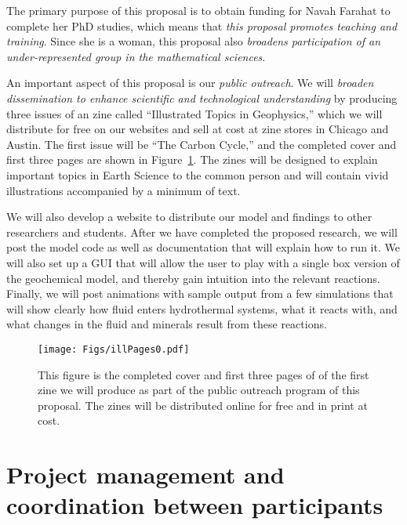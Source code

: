\documentclass[authoryear,round,12pt]{article}
\begin{document}
The primary purpose of this proposal is to obtain funding for Navah
Farahat to complete her PhD studies, which means that \textit{this
  proposal promotes teaching and training}. Since she is a woman, this
proposal also \textit{broadens participation of an under-represented
  group in the mathematical sciences}.

An important aspect of this proposal is our \textit{public
  outreach}. We will \textit{broaden dissemination to enhance
  scientific and technological understanding} by producing three
issues of an zine called ``Illustrated Topics in Geophysics,'' which
we will distribute for free on our websites and sell at cost at zine
stores in Chicago and Austin. The first issue will be ``The Carbon
Cycle,'' and the completed cover and first three pages are shown in
Figure~\ref{fig:illCover}. The zines will be designed to explain
important topics in Earth Science to the common person and will
contain vivid illustrations accompanied by a minimum of text.

We will also develop a website to distribute our model and findings to
other researchers and students. After we have completed the proposed
research, we will post the model code as well as documentation that
will explain how to run it. We will also set up a GUI that will allow
the user to play with a single box version of the geochemical model,
and thereby gain intuition into the relevant reactions. Finally, we
will post animations with sample output from a few simulations that
will show clearly how fluid enters hydrothermal systems, what it
reacts with, and what changes in the fluid and minerals result from
these reactions.

\begin{figure}[h!]
\begin{center}
\texttt{[image: Figs/illPages0.pdf]}
\end{center}
\caption{This figure is the completed cover and first three pages of of the first 
zine we will produce as part of the public outreach program of this proposal. 
The zines will be distributed online for free and in print at cost.}
\label{fig:illCover}
\end{figure}


\section{Project management and coordination between participants}
\label{sec:proj-management}
\end{document}
